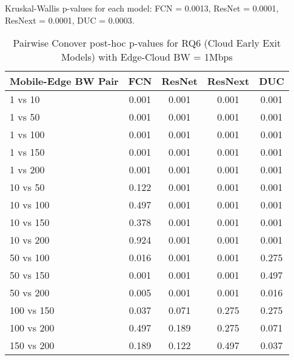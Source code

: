 \begin{table}[h]
\centering
\caption{Pairwise Conover post-hoc p-values for RQ6 (Cloud Early Exit Models) with Edge-Cloud BW = 1Mbps}
\label{tab:conover_cloud_earlyexit_ec1}
\smallskip
Kruskal-Wallis p-values for each model: FCN = 0.0013, ResNet = 0.0001, ResNext = 0.0001, DUC = 0.0003.

\begin{tabular}{lcccc}
\toprule
Mobile-Edge BW Pair & FCN & ResNet & ResNext & DUC \\
\midrule
1 vs 10 & 0.001 & 0.001 & 0.001 & 0.001 \\
1 vs 50 & 0.001 & 0.001 & 0.001 & 0.001 \\
1 vs 100 & 0.001 & 0.001 & 0.001 & 0.001 \\
1 vs 150 & 0.001 & 0.001 & 0.001 & 0.001 \\
1 vs 200 & 0.001 & 0.001 & 0.001 & 0.001 \\
10 vs 50 & 0.122 & 0.001 & 0.001 & 0.001 \\
10 vs 100 & 0.497 & 0.001 & 0.001 & 0.001 \\
10 vs 150 & 0.378 & 0.001 & 0.001 & 0.001 \\
10 vs 200 & 0.924 & 0.001 & 0.001 & 0.001 \\
50 vs 100 & 0.016 & 0.001 & 0.001 & 0.275 \\
50 vs 150 & 0.001 & 0.001 & 0.001 & 0.497 \\
50 vs 200 & 0.005 & 0.001 & 0.001 & 0.016 \\
100 vs 150 & 0.037 & 0.071 & 0.275 & 0.275 \\
100 vs 200 & 0.497 & 0.189 & 0.275 & 0.071 \\
150 vs 200 & 0.189 & 0.122 & 0.497 & 0.037 \\
\bottomrule
\end{tabular}
\end{table}

